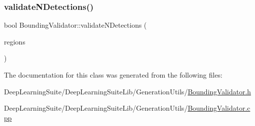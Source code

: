 \subsubsection{\texorpdfstring{validate\+N\+Detections()}{validateNDetections()}}
{\footnotesize\ttfamily bool Bounding\+Validator\+::validate\+N\+Detections (\begin{DoxyParamCaption}\item[{std\+::vector$<$ \hyperlink{struct_rect_region}{Rect\+Region} $>$ \&}]{regions }\end{DoxyParamCaption})}



The documentation for this class was generated from the following files\+:\begin{DoxyCompactItemize}
\item 
Deep\+Learning\+Suite/\+Deep\+Learning\+Suite\+Lib/\+Generation\+Utils/\hyperlink{_bounding_validator_8h}{Bounding\+Validator.\+h}\item 
Deep\+Learning\+Suite/\+Deep\+Learning\+Suite\+Lib/\+Generation\+Utils/\hyperlink{_bounding_validator_8cpp}{Bounding\+Validator.\+cpp}\end{DoxyCompactItemize}
